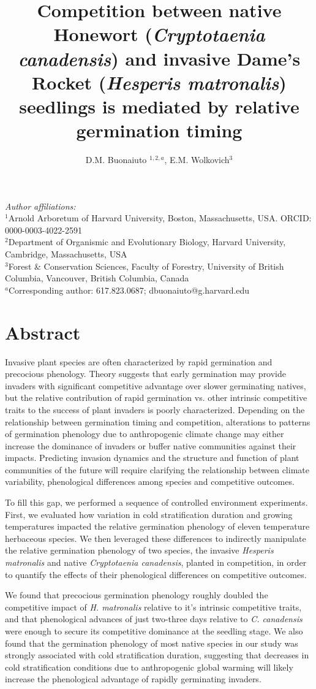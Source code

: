 \documentclass{article}\usepackage[]{graphicx}\usepackage[]{color}
\title{Competition between native Honewort (\textit{Cryptotaenia canadensis}) and invasive Dame's Rocket (\textit{Hesperis matronalis}) seedlings is mediated by relative germination timing}
\author{D.M. Buonaiuto $^{1,2,a}$, E.M. Wolkovich$^{3}$}
\begin{document}
\maketitle
\noindent \emph{Author affiliations:}\\
\noindent $^1$Arnold Arboretum of Harvard University, Boston, Massachusetts, USA. ORCID: 0000-0003-4022-2591\\
$^2$Department of Organismic and Evolutionary Biology, Harvard University, Cambridge, Massachusetts, USA \\
$^3$Forest \& Conservation Sciences, Faculty of Forestry, University of British Columbia, Vancouver, British Columbia, Canada\\
$^a$Corresponding author: 617.823.0687; dbuonaiuto@g.harvard.edu\\
\pagebreak
\section*{Abstract}
Invasive plant species are often characterized by rapid germination and precocious phenology. Theory suggests that early germination may provide invaders with significant competitive advantage over slower germinating natives, but the relative contribution of rapid germination vs. other intrinsic competitive traits to the success of plant invaders is poorly characterized. Depending on the relationship between germination timing and competition, alterations to patterns of germination phenology due to anthropogenic climate change may either increase the dominance of invaders or buffer native communities against their impacts. Predicting invasion dynamics and the structure and function of plant communities of the future will require clarifying the relationship between climate variability, phenological differences among species and competitive outcomes.

To fill this gap, we performed a sequence of controlled environment experiments. First, we evaluated how variation in cold stratification duration and growing temperatures impacted the relative germination phenology of eleven temperature herbaceous species. We then leveraged these differences to indirectly manipulate the relative germination phenology of two species, the invasive \textit{Hesperis matronalis} and native \textit{Cryptotaenia canadensis}, planted in competition, in order to quantify the effects of their phenological differences on competitive outcomes.

We found that precocious germination phenology roughly doubled the competitive impact of \textit{H. matronalis} relative to it's intrinsic competitive traits, and that phenological advances of just two-three days relative to \textit{C. canadensis} were enough to secure its competitive dominance at the seedling stage. We also found that the germination phenology of most native species in our study was strongly associated with cold stratification duration, suggesting that decreases in cold stratification conditions due to anthropogenic global warming will likely increase the phenological advantage of rapidly germinating invaders. 
\end{document}
